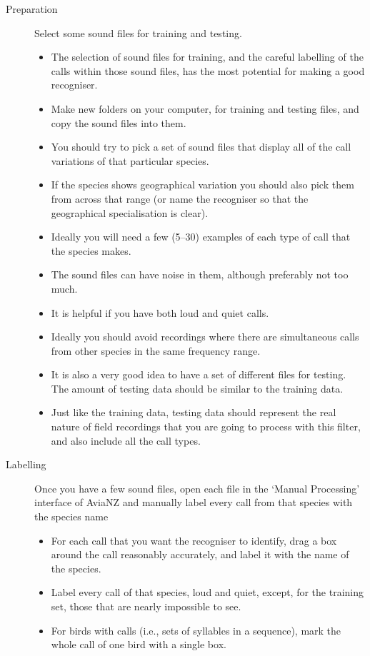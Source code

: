 \documentclass{article}
\begin{document}
\begin{description}
\item[Preparation] Select some sound files for training and testing. 
\begin{itemize}
\item The selection of sound files for training, and the careful labelling of the calls within those sound files, has the most potential for making a good recogniser. 
\item Make new folders on your computer, for training and testing files, and copy the sound files into them.
\item You should try to pick a set of sound files that display all of the call variations of that particular species. 
\item If the species shows geographical variation you should also pick them from across that range (or name the recogniser so that the geographical specialisation is clear).  
\item Ideally you will need a few (5--30) examples of each type of call that the species makes. 
\item The sound files can have noise in them, although preferably not too much. 
\item It is helpful if you have both loud and quiet calls. 
\item Ideally you should avoid recordings where there are simultaneous calls from other species in the same frequency range. 
\item It is also a very good idea to have a set of different files for testing. The amount of testing data should be similar to the training data. 
\item Just like the training data, testing data should represent the real nature of field recordings that you are going to process with this filter, and also include all the call types.
\end{itemize}
\item[Labelling] Once you have a few sound files, open each file in the `Manual Processing' interface of AviaNZ and manually label every call from that species with the species name
\begin{itemize}
\item For each call that you want the recogniser to identify, drag a box around the call reasonably accurately, and label it with the name of the species.
\item Label every call of that species, loud and quiet, except, for the training set, those that are nearly impossible to see.
\item For birds with calls (i.e., sets of syllables in a sequence), mark the whole call of one bird with a single box. 

\end{itemize}
\end{description}
\end{document}
